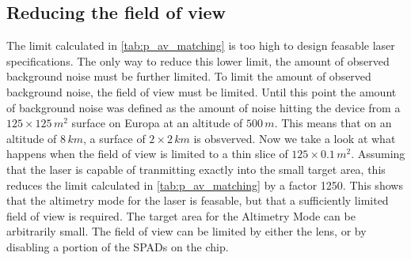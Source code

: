 \subsection{Reducing the field of view}
The limit calculated in \cref{tab:p_av_matching} is too high to design feasable laser specifications. The only way to reduce this lower limit, the amount of observed background noise must be further limited. To limit the amount of observed background noise, the field of view must be limited. Until this point the amount of background noise was defined as the amount of noise hitting the device from a $125\times125\,m^2$ surface on Europa at an altitude of $500\,m$. This means that on an altitude of $8\,km$, a surface of $2\times2\,km$ is obsverved. Now we take a look at what happens when the field of view is limited to a thin slice of $125\times0.1\,m^2$. Assuming that the laser is capable of tranmitting exactly into the small target area, this reduces the limit calculated in \cref{tab:p_av_matching} by a factor 1250. This shows that the altimetry mode for the laser is feasable, but that a sufficiently limited field of view is required. The target area for the Altimetry Mode can be arbitrarily small. The field of view can be limited by either the lens, or by disabling a portion of the SPADs on the chip.
